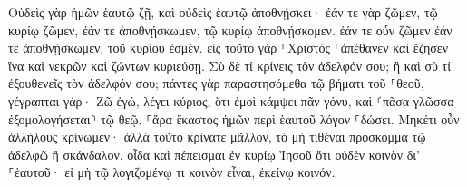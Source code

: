 \documentclass{openreader}
\begin{document}
Οὐδεὶς γὰρ ἡμῶν ἑαυτῷ ζῇ, καὶ οὐδεὶς ἑαυτῷ ἀποθνῄσκει· 
ἐάν τε γὰρ ζῶμεν, τῷ κυρίῳ ζῶμεν, ἐάν τε ἀποθνῄσκωμεν, τῷ κυρίῳ ἀποθνῄσκομεν. ἐάν τε οὖν ζῶμεν ἐάν τε ἀποθνῄσκωμεν, τοῦ κυρίου ἐσμέν. 
εἰς τοῦτο γὰρ ⸀Χριστὸς ⸀ἀπέθανεν καὶ ἔζησεν ἵνα καὶ νεκρῶν καὶ ζώντων κυριεύσῃ. 
Σὺ δὲ τί κρίνεις τὸν ἀδελφόν σου; ἢ καὶ σὺ τί ἐξουθενεῖς τὸν ἀδελφόν σου; πάντες γὰρ παραστησόμεθα τῷ βήματι τοῦ ⸀θεοῦ, 
γέγραπται γάρ· Ζῶ ἐγώ, λέγει κύριος, ὅτι ἐμοὶ κάμψει πᾶν γόνυ, καὶ ⸂πᾶσα γλῶσσα ἐξομολογήσεται⸃ τῷ θεῷ. 
⸀ἄρα ἕκαστος ἡμῶν περὶ ἑαυτοῦ λόγον ⸀δώσει. 
Μηκέτι οὖν ἀλλήλους κρίνωμεν· ἀλλὰ τοῦτο κρίνατε μᾶλλον, τὸ μὴ τιθέναι πρόσκομμα τῷ ἀδελφῷ ἢ σκάνδαλον. 
οἶδα καὶ πέπεισμαι ἐν κυρίῳ Ἰησοῦ ὅτι οὐδὲν κοινὸν δι’ ⸀ἑαυτοῦ· εἰ μὴ τῷ λογιζομένῳ τι κοινὸν εἶναι, ἐκείνῳ κοινόν. 
\end{document}
